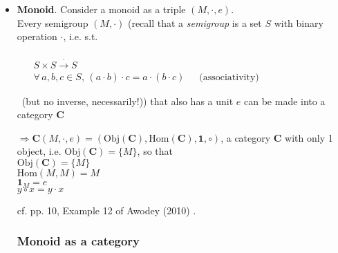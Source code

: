 \documentclass[10pt]{amsart}
\begin{document}
\begin{multicols*}{2}
\begin{itemize}
	\quad \\
	$\forall \, $ preorder $P$ can be regarded as a category: \\
	$\text{Obj}(P) = P$ \\
	$a \to b$ iff $a\leq b \in \text{Mor}P$. \\
	identity: $1 :a \to a$ since $a\leq a$ \\
	composition: $f:a\to b$, $g:b\to c$, $(g\circ f)a = g(b) = c$, $a\leq b$ and $b\leq c$, so $a\leq c$. 
	
	Going in the other direction, a category with at most 1 arrow between 2 objects determines a preorder.
	\item \textbf{Monoid}.  Consider a monoid as a triple $(M, \cdot, e)$.  \\
	Every semigroup $(M,\cdot)$ (recall that a \emph{semigroup} is a set $S$ with binary operation $\cdot $, i.e. s.t.
	
	\quad \,  $\begin{aligned} & \quad \\
	& S\times S \xrightarrow{\cdot } S \\ 
	& \forall \, a,b ,c \in S, \, (a\cdot b)\cdot c = a\cdot (b\cdot c) \quad \, \text{ (associativity) } \end{aligned}$ 
	
	\quad \, (but no inverse, necessarily!)) that also has a unit $e$ can be made into a category $\mathbf{C}$ 
	
	$\Longrightarrow \mathbf{C}(M,\cdot ,e) = (\text{Obj}(\mathbf{C}), \text{Hom}(\mathbf{C}), \mathbf{1}, \circ)$, a category $\mathbf{C}$ with only 1 object, i.e. $\text{Obj}(\mathbf{C}) = \lbrace M \rbrace$, so that \\
	$\text{Obj}(\mathbf{C}) = \lbrace M \rbrace$ \\
	$\text{Hom}(M,M) = M$ \\
	$\mathbf{1}_M = e$ \\
	$y \circ x = y \cdot x$
	
	cf. pp. 10, Example 12 of Awodey (2010) \cite{Awod2010}.

\subsubsection{Monoid as a category}


\end{itemize}
\end{multicols*}
\end{document}
